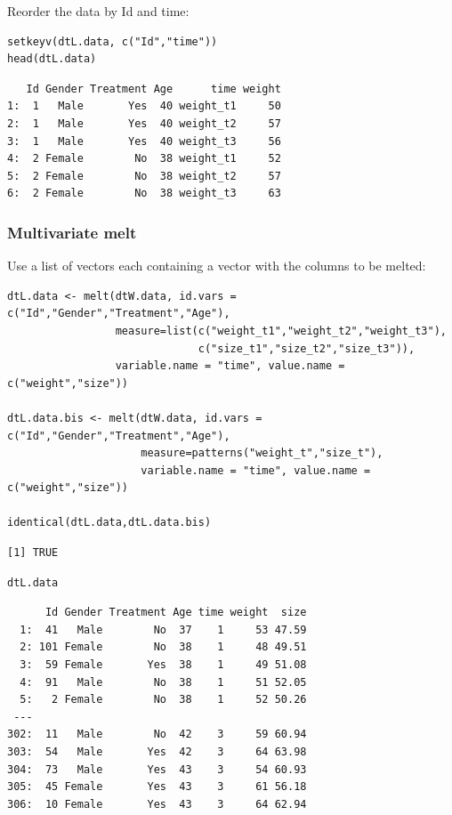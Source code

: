 \documentclass{article}
\begin{document}
Reorder the data by Id and time:
\lstset{language=r,label= ,caption= ,captionpos=b,numbers=none}
\begin{lstlisting}
setkeyv(dtL.data, c("Id","time"))
head(dtL.data)
\end{lstlisting}

\begin{verbatim}
   Id Gender Treatment Age      time weight
1:  1   Male       Yes  40 weight_t1     50
2:  1   Male       Yes  40 weight_t2     57
3:  1   Male       Yes  40 weight_t3     56
4:  2 Female        No  38 weight_t1     52
5:  2 Female        No  38 weight_t2     57
6:  2 Female        No  38 weight_t3     63
\end{verbatim}

\clearpage

\subsubsection{Multivariate melt}
\label{sec:org1445964}

Use a list of vectors each containing a vector with the columns to be
melted:
\lstset{language=r,label= ,caption= ,captionpos=b,numbers=none}
\begin{lstlisting}
dtL.data <- melt(dtW.data, id.vars = c("Id","Gender","Treatment","Age"), 
				 measure=list(c("weight_t1","weight_t2","weight_t3"), 
							  c("size_t1","size_t2","size_t3")),
				 variable.name = "time", value.name = c("weight","size"))

dtL.data.bis <- melt(dtW.data, id.vars = c("Id","Gender","Treatment","Age"), 
					 measure=patterns("weight_t","size_t"),
					 variable.name = "time", value.name = c("weight","size"))

identical(dtL.data,dtL.data.bis)
\end{lstlisting}

\begin{verbatim}
[1] TRUE
\end{verbatim}

\lstset{language=r,label= ,caption= ,captionpos=b,numbers=none}
\begin{lstlisting}
dtL.data
\end{lstlisting}

\begin{verbatim}
      Id Gender Treatment Age time weight  size
  1:  41   Male        No  37    1     53 47.59
  2: 101 Female        No  38    1     48 49.51
  3:  59 Female       Yes  38    1     49 51.08
  4:  91   Male        No  38    1     51 52.05
  5:   2 Female        No  38    1     52 50.26
 ---                                           
302:  11   Male        No  42    3     59 60.94
303:  54   Male       Yes  42    3     64 63.98
304:  73   Male       Yes  43    3     54 60.93
305:  45 Female       Yes  43    3     61 56.18
306:  10 Female       Yes  43    3     64 62.94
\end{verbatim}
\end{document}
